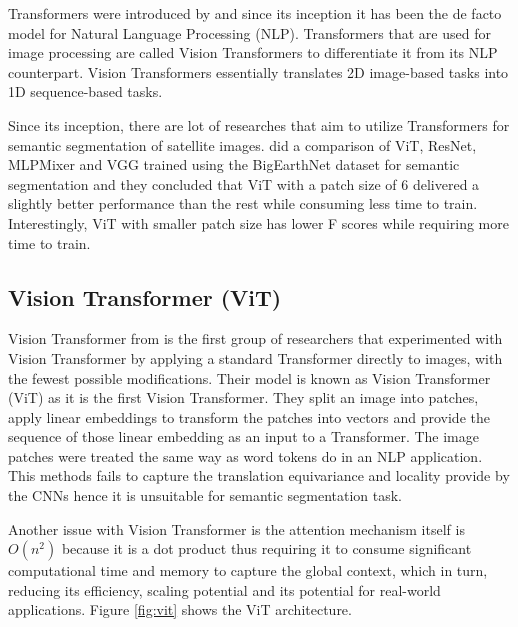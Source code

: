 Transformers were introduced by \cite{attention-is-all-you-need} and since its inception it has been the de facto model for Natural Language Processing (NLP). Transformers that are used for image processing are called Vision Transformers to differentiate it from its NLP counterpart. Vision Transformers essentially translates 2D image-based tasks into 1D sequence-based tasks.

Since its inception, there are lot of researches that aim to utilize Transformers for semantic segmentation of satellite images. 
\cite{benchmarking-scaling} did a comparison of ViT, ResNet, MLPMixer and VGG trained using the BigEarthNet dataset for semantic segmentation and they concluded that ViT with a patch size of 6 delivered a slightly better performance than the rest while consuming less time to train. Interestingly, ViT with smaller patch size has lower F scores while requiring more time to train.

\subsection{Vision Transformer (ViT)}
Vision Transformer from \cite{16x16} is the first group of researchers that experimented with Vision Transformer by applying a standard Transformer directly to images, with the fewest possible modifications. Their model is known as Vision Transformer (ViT) as it is the first Vision Transformer. They split an image into patches, apply linear embeddings to transform the patches into vectors and provide the sequence of those linear embedding as an input to a Transformer. The image patches were treated the same way as word tokens do in an NLP application. This methods fails to capture the  translation equivariance and locality provide by the CNNs hence it is unsuitable for semantic segmentation task.

Another issue with Vision Transformer is the attention mechanism itself is $O(n^2)$ because it is a dot product thus requiring it to consume significant computational time and memory to capture the global context, which in turn, reducing its efficiency, scaling potential and its potential for real-world applications. Figure \ref{fig:vit} shows the ViT architecture.


